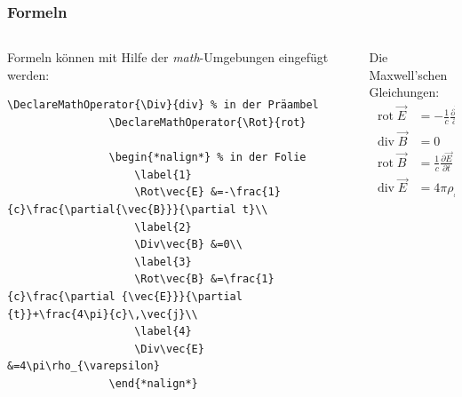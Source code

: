 \documentclass[german,notoc,draft]{tudbeamer}%
\DeclareMathOperator{\Div}{div}
\DeclareMathOperator{\Rot}{rot}
\begin{document}
\begin{frame}[fragile]
	\frametitle{Formeln}

	\begin{columns}[T,onlytextwidth]
		\begin{column}[T]{.7\textwidth}
			Formeln können mit Hilfe der \emph{math}-Umgebungen eingefügt werden:
			\begin{lstlisting}[gobble=8,style=latex]				
				\DeclareMathOperator{\Div}{div} % in der Präambel
				\DeclareMathOperator{\Rot}{rot}

				\begin{*nalign*} % in der Folie
					\label{1}
					\Rot\vec{E} &=-\frac{1}{c}\frac{\partial{\vec{B}}}{\partial t}\\
					\label{2}
					\Div\vec{B} &=0\\
					\label{3}
					\Rot\vec{B} &=\frac{1}{c}\frac{\partial {\vec{E}}}{\partial {t}}+\frac{4\pi}{c}\,\vec{j}\\
					\label{4}
					\Div\vec{E} &=4\pi\rho_{\varepsilon}
				\end{*nalign*}
			\end{lstlisting} 
		\end{column}
		\begin{column}[T]{.295\textwidth}
			Die Maxwell'schen Gleichungen:
			\normalsize
			\begin{align}
				\label{1}
				\Rot\vec{E} &=-\frac{1}{c}\frac{\partial{\vec{B}}}{\partial t}
				\\
				\label{2}
				\Div\vec{B} &=0
				\\
				\label{3}
				\Rot\vec{B} &=\frac{1}{c}\frac{\partial {\vec{E}}}{\partial {t}}+\frac{4\pi}{c}\,\vec{j}
				\\
				\label{4}
				\Div\vec{E} &=4\pi\rho_{\varepsilon}
			\end{align}
		\end{column}
	\end{columns}
\end{frame}
\end{document}
